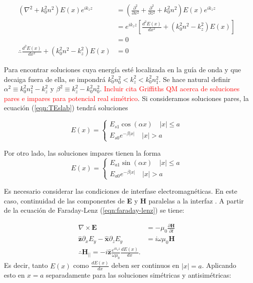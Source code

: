 \begin{align}
(\nabla^2  + k_0^2n^2) E(x)e^{ik_z z} &=  \left(\frac{\partial^2}{\partial x^2} + \frac{\partial^2}{\partial z^2} + k_0^2n^2\right) E(x)e^{ik_z z } 
\nonumber
\\
&= e^{ik_z z}\left[\frac{d^2  E(x)}{dx^2}  + (k_0^2n^2 -  k_z^2)E(x) \right]
\nonumber
\\
&=0
\nonumber
\\
\therefore \frac{d^2  E(x)}{dx^2}  + (k_0^2n^2 -  k_z^2)E(x) &= 0 \label{eqn:TEslab}
\end{align}

Para encontrar soluciones cuya energía esté localizada en la guía de onda y que decaiga fuera de ella, se impondrá $k_0^2n_0^2 < k_z^2 < k_0^2n_1^2$. Se hace natural definir $\alpha^2\equiv k_0^2n_1^2-k_z^2$ y $\beta^2\equiv k_z^2 - k_0^2n_0^2$. \textcolor{red}{Incluir cita Griffiths QM acerca de soluciones pares e impares para potencial real simétrico}. Si consideramos soluciones pares, la ecuación (\ref{eqn:TEslab}) tendrá soluciones

\begin{equation*}
	E(x) = \left\{\begin{matrix}
	E_{s1}\cos(\alpha x)\quad |x|\le a
	\\
	E_{s0}e^{-\beta|x|} \quad |x|>a
	\end{matrix}\right.
\end{equation*}

Por otro lado, las soluciones impares tienen la forma
\begin{equation*}
	E(x) = \left\{\begin{matrix}
	E_{a1}\sin(\alpha x)\quad |x|\le a
	\\
	E_{a0}e^{-\beta|x|} \quad |x|>a
	\end{matrix}\right.
\end{equation*}


Es necesario considerar las condiciones de interfase electromagnéticas. En este caso, continuidad de las componentes de \textbf{E} y \textbf{H} paralelas a la interfaz . A partir de la ecuación de Faraday-Lenz (\ref{eqn:faraday-lenz}) se tiene:

\begin{align*}
	\nabla\times\textbf{E} &= -\mu_0\frac{\partial \textbf{H}}{\partial t}
	\\
	\mathbf{\hat{z}}\partial_x E_y-\mathbf{\hat{x}}\partial_z E_y  &= i\omega \mu_0  \textbf{H}
	\\	
	\therefore \textbf{H}_{||} = -i\mathbf{\hat{z}}\frac{e^{ik_z z}}{\omega\mu_0}\frac{d E(x)}{dx}.
\end{align*}
Es decir, tanto $E(x)$ como $\frac{dE(x)}{dx}$ deben ser continuos en $|x|=a$. Aplicando esto en $x=a$ separadamente para las soluciones simétricas y antisimétricas:

